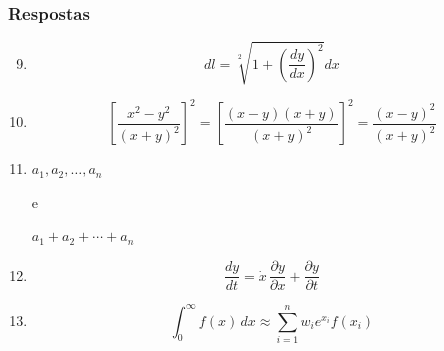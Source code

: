 \documentclass[handout,10pt]{beamer}
\begin{document}
\begin{frame}[fragile,label=respostas9-13]
	\frametitle{Respostas}
	\scriptsize
	
	\begin{enumerate}\setcounter{enumi}{8}
	\item%
		\begin{LaTeXcode}
		\[dl = \sqrt[2]{1 + \left( \frac{dy}{dx} \right)^2} dx\]
		\end{LaTeXcode}	
	
	\item%
		\begin{LaTeXcode}
		\[\left[ \frac{x^2 - y^2}{ \left( x + y \right)^2 } \right]^2
		=	\left[ \frac{\left(x - y\right)\left(x + y\right)}{ \left(
		x +	y \right)^2 } \right]^2 =	\frac{\left(x - y\right)^2}{
		\left( x + y \right)^2 }\]
		\end{LaTeXcode}
		
	\item%
		\begin{LaTeXcode}
		\(a_1, a_2, \ldots, a_n\)
		\end{LaTeXcode} e
		\begin{LaTeXcode}
		\(a_1 + a_2 + \cdots + a_n\)
		\end{LaTeXcode}
		
	\item%
		\begin{LaTeXcode}
		\[\frac{dy}{dt} = \dot x \, \frac{\partial y}{\partial x} 
		+ \frac{\partial y}{\partial t}\]
		\end{LaTeXcode}
		
	\item%
		\begin{LaTeXcode}
		\[\int_0^\infty f(x)\, dx \approx \sum_{i = 1}^n w_i
		e^{x_i} f(x_i)\]
		\end{LaTeXcode}
	\end{enumerate}
	
\end{frame}
\end{document}
